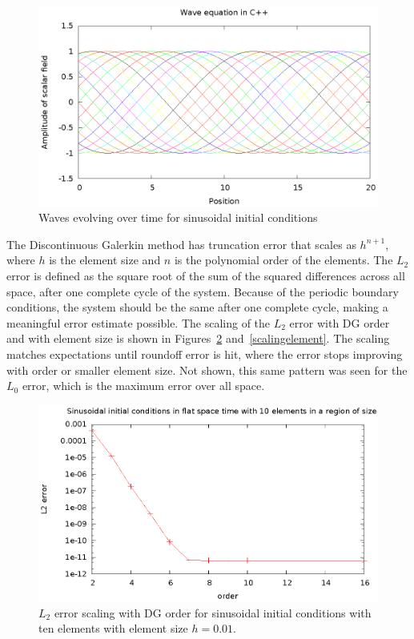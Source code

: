 \begin{figure}
  \includegraphics{sineWave}
  \caption{Waves evolving over time for sinusoidal initial conditions}
  \label{sineWave}
\end{figure}

The Discontinuous Galerkin method has truncation error that scales as $h^{n+1}$, where $h$ is the element size and $n$ is the polynomial order of the elements. The $L_2$ error is defined as the square root of the sum of the squared differences across all space, after one complete cycle of the system. Because of the periodic boundary conditions, the system should be the same after one complete cycle, making a meaningful error estimate possible. The scaling of the $L_2$ error with DG order and with element size is shown in Figures~\ref{scalingorder} and~\ref{scalingelement}. The scaling matches expectations until roundoff error is hit, where the error stops improving with order or smaller element size. Not shown, this same pattern was seen for the $L_0$ error, which is the maximum error over all space.

\begin{figure}
  \includegraphics{sinL2WTorder}
  \caption{$L_2$ error scaling with DG order for sinusoidal initial conditions with ten elements with element size $h=0.01$.}
  \label{scalingorder}
\end{figure}

